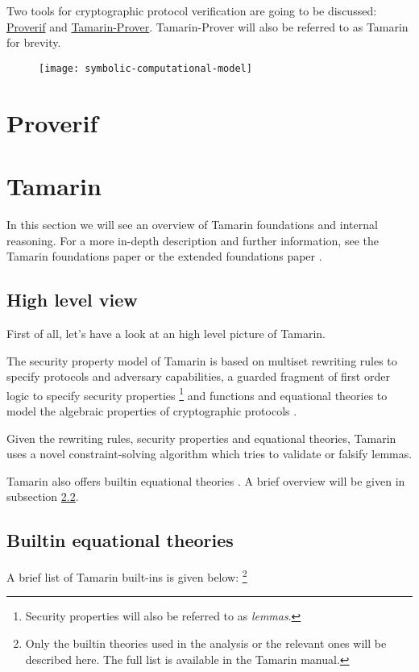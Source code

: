 
Two tools for cryptographic protocol verification are going to be discussed: \href{https://prosecco.gforge.inria.fr/personal/bblanche/proverif/}{Proverif} and \href{https://tamarin-prover.github.io/}{Tamarin-Prover}. Tamarin-Prover will also be referred to as Tamarin for brevity.

\begin{figure}[!h]
\texttt{[image: symbolic-computational-model]}
\centering
\end{figure}

\section{Proverif}

\section{Tamarin}
In this section we will see an overview of Tamarin foundations and internal reasoning.
For a more in-depth description and further information, see the Tamarin foundations paper \cite{TamarinFoundations} or the extended foundations paper \cite{TamarinFoundationsExtended}.

\subsection{High level view}
First of all, let's have a look at an high level picture of Tamarin.

The security property model of Tamarin is based on multiset rewriting rules to specify protocols and adversary capabilities, a guarded fragment \cite{FragmentFirstOrderLogicPaper} of first order logic to specify security properties \footnote{Security properties will also be referred to as \textit{lemmas}.} and functions and equational theories to model the algebraic properties of cryptographic protocols \cite{TamarinFoundations}.

Given the rewriting rules, security properties and equational theories, Tamarin uses a novel constraint-solving algorithm which tries to validate or falsify lemmas.

Tamarin also offers builtin equational theories \cite{TamarinProverManual}. A brief overview will be given in subsection \ref{Proverif-and-Tamarin_Tamarin_Builtin-equational-theories}.

\subsection{Builtin equational theories}
\label{Proverif-and-Tamarin_Tamarin_Builtin-equational-theories}
A brief list of Tamarin built-ins is given below: \footnote{Only the builtin theories used in the analysis or the relevant ones will be described here. The full list is available in the Tamarin manual.}

